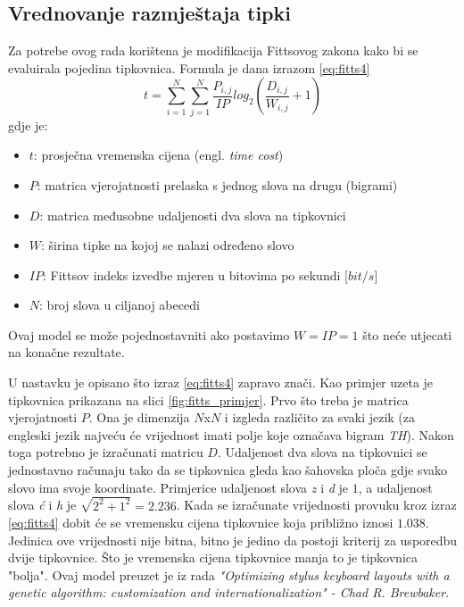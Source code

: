 \documentclass[times, utf8, zavrsni]{fer}
\begin{document}
\subsection{Vrednovanje razmještaja tipki}
Za potrebe ovog rada korištena je modifikacija Fittsovog zakona kako bi se evaluirala pojedina tipkovnica. Formula je dana izrazom \ref{eq:fitts4}
\begin{equation}
\label{eq:fitts4}
t = \sum_{i=1}^{N}\sum_{j=1}^{N}\frac{P_{i,j}}{IP}log_2(\frac{D_{i,j}}{W_{i,j}} + 1)
\end{equation}
gdje je:
\begin{itemize}
\item $t$: prosječna vremenska cijena (engl. \emph{time cost})
\item $P$: matrica vjerojatnosti prelaska s jednog slova na drugu (bigrami)
\item $D$: matrica međusobne udaljenosti dva slova na tipkovnici
\item $W$: širina tipke na kojoj se nalazi određeno slovo
\item $IP$: Fittsov indeks izvedbe mjeren u bitovima po sekundi [$bit/s$]
\item $N$: broj slova u ciljanoj abecedi
\end{itemize}
Ovaj model se može pojednostavniti ako postavimo $W=IP=1$ što neće utjecati na konačne rezultate.

U nastavku je opisano što izraz \ref{eq:fitts4} zapravo znači. Kao primjer uzeta je tipkovnica prikazana na slici \ref{fig:fitts_primjer}. Prvo što treba je matrica vjerojatnosti $P$. Ona je dimenzija $N$x$N$ i izgleda različito za svaki jezik (za engleski jezik najveću će vrijednost imati polje koje označava bigram \emph{TH}). Nakon toga potrebno je izračunati matricu $D$. Udaljenost dva slova na tipkovnici se jednostavno računaju tako da se tipkovnica gleda kao šahovska ploča gdje svako slovo ima svoje koordinate. Primjerice udaljenost slova \emph{z} i \emph{d} je $1$, a udaljenost slova \emph{ć} i \emph{h} je $\sqrt{2^2+1^2} = 2.236$. Kada se izračunate vrijednosti provuku kroz izraz \ref{eq:fitts4} dobit će se vremensku cijena tipkovnice koja približno iznosi $1.038$. Jedinica ove vrijednosti nije bitna, bitno je jedino da postoji kriterij za usporedbu dvije tipkovnice. Što je vremenska cijena tipkovnice manja to je tipkovnica "bolja". Ovaj model preuzet je iz rada \emph{"Optimizing stylus keyboard layouts with a genetic algorithm: customization and internationalization" - Chad R. Brewbaker}.
\end{document}
